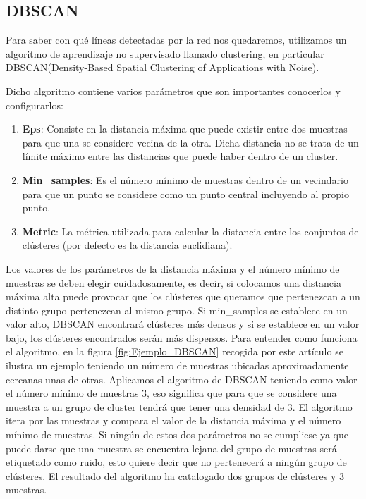 \subsection{DBSCAN}
\label{sec:DBSCAN}

Para saber con qué líneas detectadas por la red nos quedaremos, utilizamos un algoritmo de aprendizaje no supervisado llamado clustering, en particular
DBSCAN(Density-Based Spatial Clustering of Applications with Noise)\cite{ski_dbs}.\newline

Dicho algoritmo contiene varios parámetros que son importantes conocerlos y configurarlos: 
\begin{enumerate}
  \item \textbf{Eps}: Consiste en la distancia máxima que puede existir entre dos muestras para que una se considere vecina de la otra. Dicha distancia no se trata de un límite 
  máximo entre las distancias que puede haber dentro de un cluster.
  \item \textbf{Min\_samples}: Es el número mínimo de muestras dentro de un vecindario para que un punto se considere como un punto central incluyendo al propio punto.
  \item \textbf{Metric}: La métrica utilizada para calcular la distancia entre los conjuntos de clústeres (por defecto es la distancia euclidiana). 
\end{enumerate}
Los valores de los parámetros de la distancia máxima y el número mínimo de muestras se deben elegir cuidadosamente, es decir, si colocamos una distancia 
máxima alta puede provocar que los clústeres que queramos que pertenezcan a un distinto grupo pertenezcan al mismo grupo. 
Si min\_samples se establece en un valor alto, DBSCAN encontrará clústeres más densos y 
si se establece en un valor bajo, los clústeres encontrados serán más dispersos. \newline
Para entender como funciona el algoritmo, en la figura \ref{fig:Ejemplo_DBSCAN} recogida por este artículo\cite{DBSCAN} se ilustra 
un ejemplo teniendo un número de muestras ubicadas aproximadamente cercanas unas de otras. Aplicamos el algoritmo de DBSCAN 
teniendo como valor el número mínimo de muestras 3, eso significa que para que se considere una muestra a un grupo de cluster tendrá que tener una densidad de 3. El algoritmo itera por
las muestras y compara el valor de la distancia máxima y el número mínimo de muestras. 
Si ningún de estos dos parámetros no se cumpliese ya que puede darse que una muestra se encuentra lejana del grupo de muestras será etiquetado como ruido, esto quiere decir
que no pertenecerá a ningún grupo de clústeres. El resultado del algoritmo ha catalogado dos grupos de clústeres y 3 muestras. \newline

